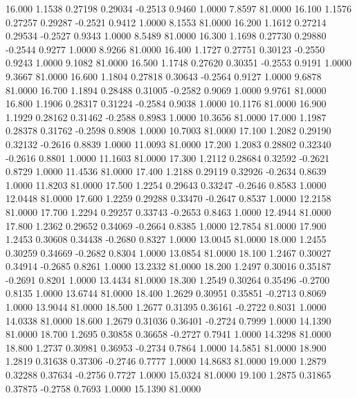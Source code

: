   16.000   1.1538   0.27198   0.29034  -0.2513   0.9460   1.0000   7.8597  81.0000
  16.100   1.1576   0.27257   0.29287  -0.2521   0.9412   1.0000   8.1553  81.0000
  16.200   1.1612   0.27214   0.29534  -0.2527   0.9343   1.0000   8.5489  81.0000
  16.300   1.1698   0.27730   0.29880  -0.2544   0.9277   1.0000   8.9266  81.0000
  16.400   1.1727   0.27751   0.30123  -0.2550   0.9243   1.0000   9.1082  81.0000
  16.500   1.1748   0.27620   0.30351  -0.2553   0.9191   1.0000   9.3667  81.0000
  16.600   1.1804   0.27818   0.30643  -0.2564   0.9127   1.0000   9.6878  81.0000
  16.700   1.1894   0.28488   0.31005  -0.2582   0.9069   1.0000   9.9761  81.0000
  16.800   1.1906   0.28317   0.31224  -0.2584   0.9038   1.0000  10.1176  81.0000
  16.900   1.1929   0.28162   0.31462  -0.2588   0.8983   1.0000  10.3656  81.0000
  17.000   1.1987   0.28378   0.31762  -0.2598   0.8908   1.0000  10.7003  81.0000
  17.100   1.2082   0.29190   0.32132  -0.2616   0.8839   1.0000  11.0093  81.0000
  17.200   1.2083   0.28802   0.32340  -0.2616   0.8801   1.0000  11.1603  81.0000
  17.300   1.2112   0.28684   0.32592  -0.2621   0.8729   1.0000  11.4536  81.0000
  17.400   1.2188   0.29119   0.32926  -0.2634   0.8639   1.0000  11.8203  81.0000
  17.500   1.2254   0.29643   0.33247  -0.2646   0.8583   1.0000  12.0448  81.0000
  17.600   1.2259   0.29288   0.33470  -0.2647   0.8537   1.0000  12.2158  81.0000
  17.700   1.2294   0.29257   0.33743  -0.2653   0.8463   1.0000  12.4944  81.0000
  17.800   1.2362   0.29652   0.34069  -0.2664   0.8385   1.0000  12.7854  81.0000
  17.900   1.2453   0.30608   0.34438  -0.2680   0.8327   1.0000  13.0045  81.0000
  18.000   1.2455   0.30259   0.34669  -0.2682   0.8304   1.0000  13.0854  81.0000
  18.100   1.2467   0.30027   0.34914  -0.2685   0.8261   1.0000  13.2332  81.0000
  18.200   1.2497   0.30016   0.35187  -0.2691   0.8201   1.0000  13.4434  81.0000
  18.300   1.2549   0.30264   0.35496  -0.2700   0.8135   1.0000  13.6744  81.0000
  18.400   1.2629   0.30951   0.35851  -0.2713   0.8069   1.0000  13.9044  81.0000
  18.500   1.2677   0.31395   0.36161  -0.2722   0.8031   1.0000  14.0338  81.0000
  18.600   1.2679   0.31036   0.36401  -0.2724   0.7999   1.0000  14.1390  81.0000
  18.700   1.2695   0.30858   0.36658  -0.2727   0.7941   1.0000  14.3298  81.0000
  18.800   1.2737   0.30981   0.36953  -0.2734   0.7864   1.0000  14.5851  81.0000
  18.900   1.2819   0.31638   0.37306  -0.2746   0.7777   1.0000  14.8683  81.0000
  19.000   1.2879   0.32288   0.37634  -0.2756   0.7727   1.0000  15.0324  81.0000
  19.100   1.2875   0.31865   0.37875  -0.2758   0.7693   1.0000  15.1390  81.0000
